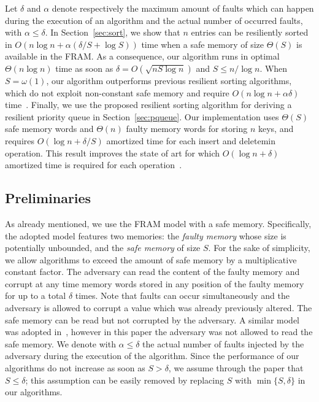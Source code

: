 \documentclass[review,number]{elsarticle}
\newcommand{\BO}[1]{{O}\left(#1\right)}
\newcommand{\BT}[1]{{\Theta}\left(#1\right)}
\begin{document}
Let $\delta$ and $\alpha$ denote respectively the maximum amount of faults which
can happen during the execution of an algorithm and the actual number of
occurred faults, with $\alpha \leq \delta$. In Section~\ref{sec:sort}, we show
that $n$ entries can be resiliently sorted in $\BO{n \log n + \alpha (\delta /S
+\log S)}$ time when a safe memory of size $\BT{S}$ is available in the FRAM. As
a consequence, our algorithm runs in optimal $\BT{n\log n}$ time as soon as
$\delta=\BO{\sqrt{n S\log n}}$ and $S\leq n/\log n$. When $S=\omega(1)$, our
algorithm outperforms previous resilient sorting algorithms, which do not
exploit non-constant safe memory and require $\BO{n\log n+ \alpha\delta}$
time~\cite{FGI09,KT12}. Finally, we use the proposed resilient sorting algorithm
for deriving a resilient priority queue in Section~\ref{sec:pqueue}.  Our
implementation uses $\BT{S}$ safe memory words and $\BT{n}$ faulty memory words
for storing $n$ keys, and requires $\BO{\log n + \delta/S}$ amortized time for
each insert and deletemin operation. This result improves the state of art for
which $\BO{\log n + \delta}$ amortized time is required for each
operation~\cite{JMM07}.


\subsection{Preliminaries}
As already mentioned, we use the FRAM model with a safe memory. Specifically,
the adopted model features two memories: the \emph{faulty memory} whose size is
potentially unbounded, and the \emph{safe memory} of size $S$. For the sake of
simplicity, we allow algorithms to exceed the amount of safe memory by a
multiplicative constant factor. The adversary can read the content of the faulty
memory and corrupt at any time memory words stored  in any position of the
faulty memory for up to a total $\delta$ times. Note that faults can occur
simultaneously and the adversary is allowed to corrupt a value which was already
previously altered. The safe memory can be read but not corrupted by the
adversary. A similar model was adopted in~\cite{CFFS11}, however in this paper
the adversary was not allowed to read the safe memory. We denote with
$\alpha\leq \delta$  the actual number of faults injected by the adversary
during the execution of the algorithm. Since the performance of our algorithms
do not increase as soon as $S>\delta$, we assume through the paper that $S\leq
\delta$; this assumption can be easily removed by replacing $S$ with $\min\{S,
\delta\}$ in our algorithms. 
\end{document}
